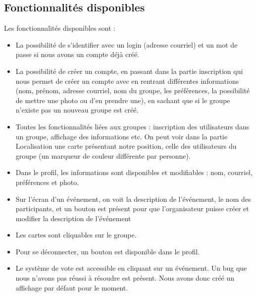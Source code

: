 \subsection{Fonctionnalités disponibles}
Les fonctionnalités disponibles sont : 
\begin{itemize}
\item La possibilité de s'identifier avec un login (adresse courriel) et un mot de passe si nous avons un compte déjà créé.
\item La possibilité de créer un compte, en passant dans la partie inscription qui nous permet de créer un compte avec en rentrant différentes informations (nom, prénom, adresse courriel, nom du groupe, les préférences, la possibilité de mettre une photo ou d'en prendre une), en sachant que si le groupe n'existe pas un nouveau groupe est créé.
\item Toutes les fonctionnalités liées aux groupes : inscription des utilisateurs dans un groupe, affichage des informations etc. On peut voir dans la partie Localisation une carte présentant notre position, celle des utilisateurs du groupe (un marqueur de couleur différente par personne).
\item Dans le profil, les informations sont disponibles et modifiables : nom, courriel, préférences et photo.
\item Sur l'écran d'un événement, on voit la description de l'événement, le nom des participants, et un bouton est présent pour que l'organisateur puisse créer et modifier la description de l'événement
\item Les cartes sont cliquables sur le groupe.
\item Pour se déconnecter, un bouton est disponible dans le profil.
\item Le système de vote est accessible en cliquant sur un événement. Un bug que nous n'avons pas réussi à résoudre est présent. Nous avons donc créé un affichage par défaut pour le moment.
\end{itemize}